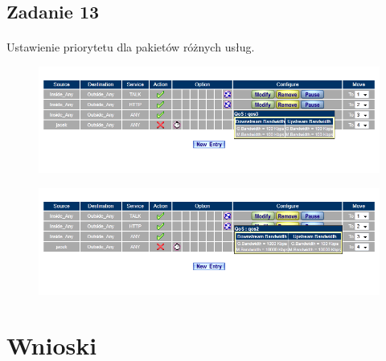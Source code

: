 \documentclass[wide,a4paper,titlepage,12pt] {article}
\begin{document}
  \subsection{Zadanie 13}
  \paragraph{}
  Ustawienie priorytetu dla pakietów różnych usług.
  \begin{figure}[h!]
    \begin{center}
      \includegraphics[width=\textwidth]{15.PNG}
    \end{center}
  \end{figure}

  \begin{figure}[h!]
    \begin{center}
      \includegraphics[width=\textwidth]{16.PNG}
    \end{center}
  \end{figure}



  \section{Wnioski}
  \paragraph{}
\end{document}
